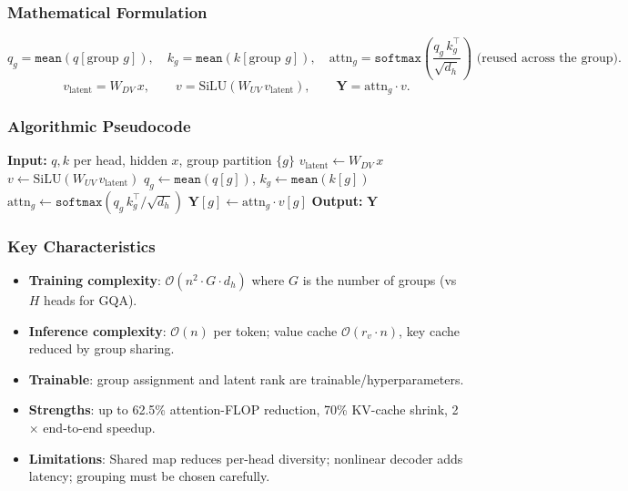 \subsubsection{Mathematical Formulation}
\[
q_g = \texttt{mean}(q[\text{group } g]), \quad k_g = \texttt{mean}(k[\text{group } g]), \quad
\text{attn}_g = \texttt{softmax}\!\left(\frac{q_g\, k_g^\top}{\sqrt{d_h}}\right) \text{ (reused across the group)}.
\]
\[
v_{\text{latent}} = W_{DV}\, x, \qquad v = \text{SiLU}(W_{UV}\, v_{\text{latent}}), \qquad
\mathbf{Y} = \text{attn}_g \cdot v.
\]

\subsubsection{Algorithmic Pseudocode}
\begin{algorithmic}[1]
\State \textbf{Input:} $q, k$ per head, hidden $x$, group partition $\{g\}$
\State $v_{\text{latent}} \gets W_{DV}\, x$ 
\State $v \gets \text{SiLU}(W_{UV}\, v_{\text{latent}})$ 
    \State $q_g \gets \texttt{mean}(q[g])$, \quad $k_g \gets \texttt{mean}(k[g])$ 
    \State $\text{attn}_g \gets \texttt{softmax}(q_g\, k_g^\top / \sqrt{d_h})$
    \State $\mathbf{Y}[g] \gets \text{attn}_g \cdot v[g]$ 
\EndFor
\State \textbf{Output:} $\mathbf{Y}$
\end{algorithmic}

\subsubsection{Key Characteristics}
\begin{itemize}[leftmargin=*]
    \item \textbf{Training complexity}: $\mathcal{O}(n^2 \cdot G \cdot d_h)$ where $G$ is the number of groups (vs $H$ heads for GQA).
    \item \textbf{Inference complexity}: $\mathcal{O}(n)$ per token; value cache $\mathcal{O}(r_v \cdot n)$, key cache reduced by group sharing.
    \item \textbf{Trainable}: group assignment and latent rank are trainable/hyperparameters.
    \item \textbf{Strengths}: up to 62.5\% attention-FLOP reduction, 70\% KV-cache shrink, 2$\times$ end-to-end speedup.
    \item \textbf{Limitations}: Shared map reduces per-head diversity; nonlinear decoder adds latency; grouping must be chosen carefully.
\end{itemize}

